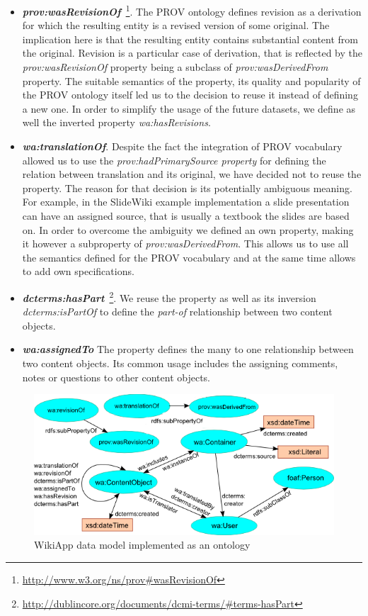 \documentclass[ngerman,UKenglish,table]{scrbook}
\begin{document}
\begin{itemize}
\item \textbf{\emph{prov:wasRevisionOf}}~\footnote{\url{http://www.w3.org/ns/prov\#wasRevisionOf}}.
The PROV ontology defines revision as a derivation for which the resulting entity is a revised version of some original.
The implication here is that the resulting entity contains substantial content from the original.
Revision is a particular case of derivation, that is reflected by the \emph{prov:wasRevisionOf} property being a subclass of \emph{prov:wasDerivedFrom} property.
The suitable semantics of the property, its quality and popularity of the PROV ontology itself led us to the decision to reuse it instead of defining a new one.
In order to simplify the usage of the future datasets, we define as well the inverted property \emph{wa:hasRevisions}.

\item \textbf{\emph{wa:translationOf}}. 
Despite the fact the integration of PROV vocabulary allowed us to use the \emph{prov:hadPrimarySource property} for defining the relation between translation and its original, we have decided not to reuse the property.
The reason for that decision is its potentially ambiguous meaning.
For example, in the SlideWiki example implementation a slide presentation can have an assigned source, that is usually a textbook the slides are based on.
In order to overcome the ambiguity we defined an own property, making it however a subproperty of \emph{prov:wasDerivedFrom}. 
This allows us to use all the semantics defined for the PROV vocabulary and at the same time allows to add own specifications.
\item \textbf{\emph{dcterms:hasPart}}~\footnote{\url{http://dublincore.org/documents/dcmi-terms/\#terms-hasPart}}.
We reuse the property as well as its inversion \emph{dcterms:isPartOf} to define the \emph{part-of} relationship between two content objects.

\item \textbf{\emph{wa:assignedTo}}
The property defines the many to one relationship between two content objects.
Its common usage includes the assigning comments, notes or questions to other content objects.
\end{itemize}
  

\begin{figure}[htb]
	\centering
		\includegraphics[width=\textwidth]{images/wa_ontology.png}
	\caption{WikiApp data model implemented as an ontology}
	\label{fig:wa_ontology}
\end{figure}
\end{document}
